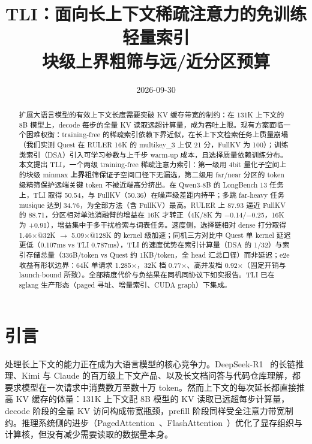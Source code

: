 \documentclass[11pt]{article}
\title{TLI：面向长上下文稀疏注意力的免训练轻量索引\\
\large 块级上界粗筛与远/近分区预算}
\date{2026-09-30}
\begin{document}
\maketitle

\begin{abstract}
扩展大语言模型的有效上下文长度需要突破 KV 缓存带宽的制约：在 131K 上下文的 8B 模型上，decode 每步的全量 KV 读取远超计算量，成为吞吐上限。现有方案面临一个困难权衡：training-free 的稀疏索引依赖下界近似，在长上下文检索任务上质量崩塌（我们实测 Quest 在 RULER 16K 的 multikey\_3 上仅 21 分，FullKV 为 100）；训练类索引（DSA）引入可学习参数与上千步 warm-up 成本，且选择质量依赖训练分布。本文提出 TLI，一个两级 training-free 稀疏注意力索引：第一级用 4bit 量化子空间上的块级 minmax \textbf{上界}粗筛保证子空间口径下无漏选，第二级用 far/near 分区的 token 级精筛保护远端关键 token 不被近端高分挤出。在 Qwen3-8B 的 LongBench 13 任务上，TLI 取得 50.54，与 FullKV（50.36）在噪声级差距内持平；多跳 far-heavy 任务 musique 达到 34.76，为全部方法（含 FullKV）最高。RULER 上 87.93 逼近 FullKV 的 88.71，分区相对单池消融臂的增益在 16K 才转正（4K/8K 为 $-$0.14/$-$0.25，16K 为 +0.91），增益集中于多干扰检索与词表任务。速度侧，选择链相对 dense 打分取得 1.46$\times$@32K $\rightarrow$ 5.09$\times$@128K 的 kernel 级加速；同机三方对比中 Quest 单 kernel 延迟更低（0.107ms vs TLI 0.787ms），TLI 的速度优势在索引计算量（DSA 的 1/32）与索引存储总量（336B/token vs Quest 约 1KB/token，全 head 汇总口径）而非延迟；e2e 收益有形状边界：64K 单请求 1.285$\times$，32K 档 0.77$\times$、高并发档 0.92$\times$（固定开销与 launch-bound 所致）。全部精度代价与负结果在同机同协议下如实报告。TLI 已在 sglang 生产形态（paged 寻址、增量索引、CUDA graph）下集成。
\end{abstract}

\section{引言}

处理长上下文的能力正在成为大语言模型的核心竞争力。DeepSeek-R1~\cite{dsr1} 的长链推理、Kimi 与 Claude 的百万级上下文产品、以及长文档问答与代码仓库理解，都要求模型在一次请求中消费数万至数十万 token。然而上下文的每次延长都直接推高 KV 缓存的体量：131K 上下文配 8B 模型的 KV 读取已远超每步计算量，decode 阶段的全量 KV 访问构成带宽瓶颈，prefill 阶段同样受全注意力带宽制约。推理系统侧的进步（PagedAttention~\cite{vllm}、FlashAttention~\cite{fa}）优化了显存组织与计算核，但没有减少需要读取的数据量本身。
\end{document}
